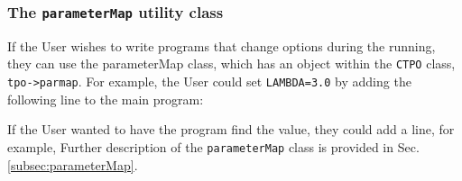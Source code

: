 \documentclass[UserManual.tex]{subfiles}
\begin{document}
\begin{sloppypar}
\subsubsection{The {\tt parameterMap} utility class}
If the User wishes to write programs that change options during the running, they can use the parameterMap class, which has an object within the {\tt CTPO} class, {\tt tpo->parmap}. For example, the User could set {\tt LAMBDA=3.0} by adding the following line to the main program:
\vspace*{-8pt}{\tt \begin{Verbatim}[commandchars=\\\{\}]
    .
   tpo->parmap.set("TPO_LAMBDA",3.0);
    .
\end{Verbatim}
}\vspace*{-8pt}

If the User wanted to have the program find the value, they could add a line, for example,
\vspace*{-8pt}{\tt \begin{Verbatim}[commandchars=\\\{\}]
    .
   int NMC=tpo->parmap.getI("TPO_NMC",0);
    .
\end{Verbatim}
}\vspace*{-8pt}
Further description of the {\tt parameterMap} class is provided in Sec. \ref{subsec:parameterMap}.

\end{sloppypar}
\end{document}
